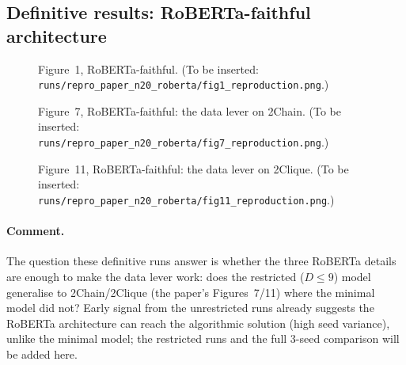 \documentclass[11pt,a4paper]{article}
\newcommand{\figplaceholder}[1]{%
  \fbox{\parbox[c][4.2cm][c]{0.9\textwidth}{\centering\itshape
  \textcolor{gray}{[Figure to be inserted once the definitive runs finish: #1]}}}}
\begin{document}
\subsection{Definitive results: RoBERTa-faithful architecture}

\begin{figure}[H]
    \centering
    \figplaceholder{RoBERTa-faithful reproduction of Figure~1 (ER / 2Chain / 2Clique vs.\ step, mean over 3 seeds)}
    \caption{Figure~1, RoBERTa-faithful. (To be inserted:
    \texttt{runs/repro\_paper\_n20\_roberta/fig1\_reproduction.png}.)}
    \label{fig:repro-rob-fig1}
\end{figure}

\begin{figure}[H]
    \centering
    \figplaceholder{RoBERTa-faithful reproduction of Figure~7 (2Chain exact match: unrestricted vs.\ restricted $D\le9$)}
    \caption{Figure~7, RoBERTa-faithful: the data lever on 2Chain. (To be
    inserted: \texttt{runs/repro\_paper\_n20\_roberta/fig7\_reproduction.png}.)}
    \label{fig:repro-rob-fig7}
\end{figure}

\begin{figure}[H]
    \centering
    \figplaceholder{RoBERTa-faithful reproduction of Figure~11 (2Clique exact match: unrestricted vs.\ restricted $D\le9$)}
    \caption{Figure~11, RoBERTa-faithful: the data lever on 2Clique. (To be
    inserted: \texttt{runs/repro\_paper\_n20\_roberta/fig11\_reproduction.png}.)}
    \label{fig:repro-rob-fig11}
\end{figure}

\paragraph{Comment.} The question these definitive runs answer is whether the
three RoBERTa details are enough to make the data lever work: does the
restricted ($D \le 9$) model generalise to 2Chain/2Clique (the paper's
Figures~7/11) where the minimal model did not? Early signal from the
unrestricted runs already suggests the RoBERTa architecture can reach the
algorithmic solution (high seed variance), unlike the minimal model; the
restricted runs and the full $3$-seed comparison will be added here.
\end{document}
